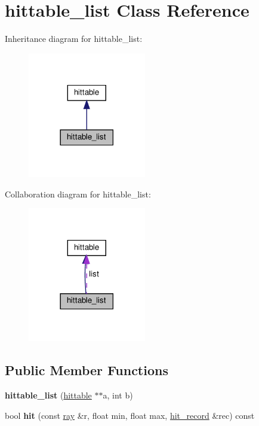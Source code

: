 \hypertarget{classhittable__list}{}\section{hittable\+\_\+list Class Reference}
\label{classhittable__list}


Inheritance diagram for hittable\+\_\+list\+:
\nopagebreak
\begin{figure}[H]
\begin{center}
\leavevmode
\includegraphics[width=146pt]{classhittable__list__inherit__graph}
\end{center}
\end{figure}


Collaboration diagram for hittable\+\_\+list\+:
\nopagebreak
\begin{figure}[H]
\begin{center}
\leavevmode
\includegraphics[width=146pt]{classhittable__list__coll__graph}
\end{center}
\end{figure}
\subsection*{Public Member Functions}
\begin{DoxyCompactItemize}
\item 
\mbox{\label{classhittable__list_af796e904d66087db710ffb8aeb7f436d}} 
{\bfseries hittable\+\_\+list} (\hyperlink{classhittable}{hittable} $\ast$$\ast$a, int b)
\item 
\mbox{\label{classhittable__list_a6a39376899a80838ee1c8e2c7cf218e1}} 
bool {\bfseries hit} (const \hyperlink{classray}{ray} \&r, float min, float max, \hyperlink{structhit__record}{hit\+\_\+record} \&rec) const
\end{DoxyCompactItemize}
